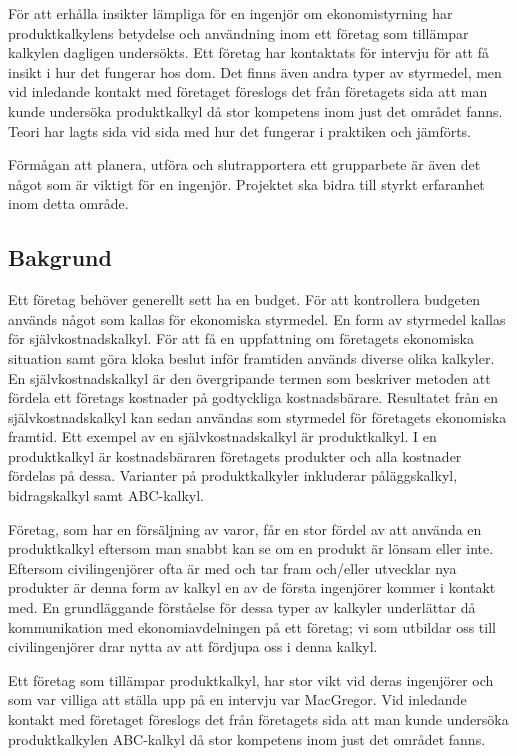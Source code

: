 För att erhålla insikter lämpliga för en ingenjör om ekonomistyrning har produktkalkylens betydelse och användning inom ett företag som tillämpar kalkylen dagligen undersökts.
Ett företag har kontaktats för intervju för att få insikt i hur det fungerar hos dom.
Det finns även andra typer av styrmedel, men vid inledande kontakt med företaget föreslogs det från företagets sida att man kunde undersöka produktkalkyl då stor kompetens inom just det området fanns.
Teori har lagts sida vid sida med hur det fungerar i praktiken och jämförts.

Förmågan att planera, utföra och slutrapportera ett grupparbete är även det något som är viktigt för en ingenjör.
Projektet ska bidra till styrkt erfaranhet inom detta område.

%
%

\subsection{Bakgrund} 
Ett företag behöver generellt sett ha en budget.
För att kontrollera budgeten används något som kallas för ekonomiska styrmedel.
En form av styrmedel kallas för självkostnadskalkyl.
För att få en uppfattning om företagets ekonomiska situation samt göra kloka beslut inför framtiden används diverse olika kalkyler.
En självkostnadskalkyl är den övergripande termen som beskriver metoden att fördela ett företags kostnader på godtyckliga kostnadsbärare.
Resultatet från en självkostnadskalkyl kan sedan användas som styrmedel för företagets ekonomiska framtid.
Ett exempel av en självkostnadskalkyl är produktkalkyl.
I en produktkalkyl är kostnadsbäraren företagets produkter och alla kostnader fördelas på dessa.
Varianter på produktkalkyler inkluderar påläggskalkyl, bidragskalkyl samt ABC-kalkyl. \cite{dne}

Företag, som har en försäljning av varor, får en stor fördel av att använda en produktkalkyl eftersom man snabbt kan se om en produkt är lönsam eller inte.
Eftersom civilingenjörer ofta är med och tar fram och/eller utvecklar nya produkter är denna form av kalkyl en av de första ingenjörer kommer i kontakt med.
En grundläggande förståelse för dessa typer av kalkyler underlättar då kommunikation med ekonomiavdelningen på ett företag; vi som utbildar oss till civilingenjörer drar nytta av att fördjupa oss i denna kalkyl. 

Ett företag som tillämpar produktkalkyl, har stor vikt vid deras ingenjörer och som var villiga att ställa upp på en intervju var MacGregor. 
Vid inledande kontakt med företaget föreslogs det från företagets sida att man kunde undersöka produktkalkylen ABC-kalkyl då stor kompetens inom just det området fanns.



